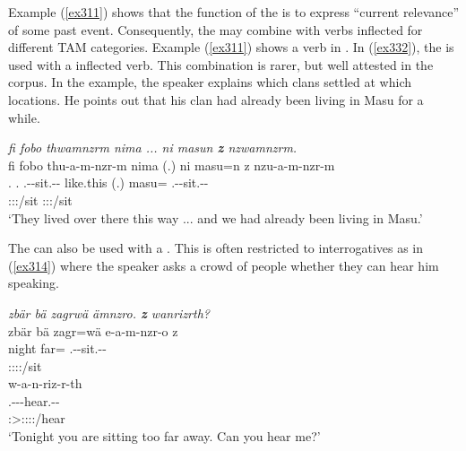 Example (\ref{ex311}) shows that the function of the  is to express ``current relevance'' of some past event. Consequently, the  may combine with verbs inflected for different TAM categories. Example (\ref{ex311}) shows a verb in  . In (\ref{ex332}), the   is used with a   inflected verb. This combination is rarer, but well attested in the corpus. In the example, the speaker explains which clans settled at which locations. He points out that his clan had already been living in Masu for a while.

\begin{exe}
	\ex \emph{fi fobo thwamnzrm nima ... ni masun \textbf{z} nzwamnzrm.}\\
	\glll fi fobo thu-a-m-nzr-m nima (.) ni masu=n z\hspace*{2cm} nzu-a-m-nzr-m\\
	\Third.\Abs{} \Dist.\All{} \Stnsg.\Betaone-\Vc-sit.\Ext-\Ndu-\Dur{} like.this (.) \Fnsg{} masu=\Loc{} \Iam{} \Fnsg.\Betaone-\Vc-sit.\Ext-\Ndu-\Dur{}\\
	{} {} \footnotesize{\Stpl:\Sbj:\Pst:\Dur/sit} {} {} {} {} {} \footnotesize{\Fpl:\Sbj:\Pst:\Dur/sit}\\
	\trans `They lived over there this way ... and we had already been living in Masu.' 
	\label{ex332}
\end{exe}

The   can also be used with a . This is often restricted to interrogatives as in (\ref{ex314}) where the speaker asks a crowd of people whether they can hear him speaking.

\begin{exe}
	\ex \emph{zbär bä zagrwä ämnzro. \textbf{z} wanrizrth?}\\
	\glll zbär bä zagr=wä e-a-m-nzr-o z\\
	night \Med{} far=\Emph{} \Stnsg.\Alph-\Vc-sit.\Ext-\Ndu-\Andat{} \Iam{}\\
	{} {} {} \footnotesize{\Stpl:\Sbj:\Nonpast:\Ipfv:\Andat/sit} {}\\
	\sn
	\glll w-a-n-riz-r-th\\
	\Fsg.\Alph-\Vc-\Venit-hear.\Ext-\Ndu-\Stnsg{}\\
	\footnotesize{\Stpl:\Sbj>\Fsg:\Io:\Nonpast:\Ipfv:\Venit/hear}\\
	\trans `Tonight you are sitting too far away. Can you hear me?' 
	\label{ex314}
\end{exe}

